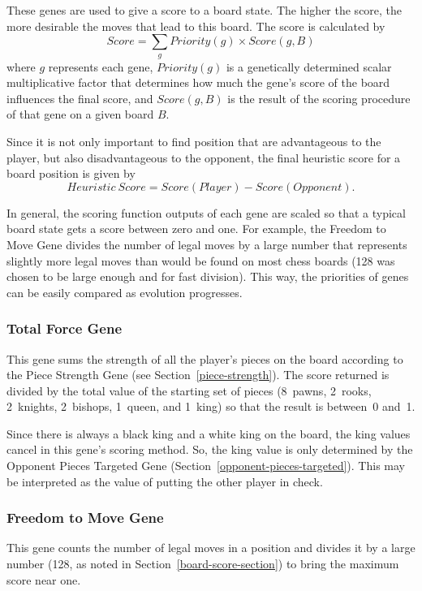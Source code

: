 \documentclass[letterpaper]{article}
\renewcommand{\_}{\allowbreak\textunderscore\allowbreak}
\begin{document}
These genes are used to give a score to a board state. The higher the score, the more desirable the moves that lead to this board. The score is calculated by
\[Score = \sum_g Priority(g) \times Score(g,B)\]
where \(g\) represents each gene, \(Priority(g)\) is a genetically determined scalar multiplicative factor that determines how much the gene's score of the board influences the final score, and \(Score(g,B)\) is the result of the scoring procedure of that gene on a given board \(B\).

Since it is not only important to find position that are advantageous to the player, but also disadvantageous to the opponent, the final heuristic score for a board position is given by
\[Heuristic\ Score = Score(Player) - Score(Opponent).\]

In general, the scoring function outputs of each gene are scaled so that a typical board state gets a score between zero and one. For example, the Freedom to Move Gene divides the number of legal moves by a large number that represents slightly more legal moves than would be found on most chess boards (128 was chosen to be large enough and for fast division). This way, the priorities of genes can be easily compared as evolution progresses.

\subsubsection{Total Force Gene}\label{total-force}
This gene sums the strength of all the player's pieces on the board according to the Piece Strength Gene (see Section~\ref{piece-strength}). The score returned is divided by the total value of the starting set of pieces (8~pawns, 2~rooks, 2~knights, 2~bishops, 1~queen, and 1~king) so that the result is between~0 and~1.

Since there is always a black king and a white king on the board, the king values cancel in this gene's scoring method. So, the king value is only determined by the Opponent Pieces Targeted Gene (Section~\ref{opponent-pieces-targeted}). This may be interpreted as the value of putting the other player in check.

\subsubsection{Freedom to Move Gene}
This gene counts the number of legal moves in a position and divides it by a large number (128, as noted in Section~\ref{board-score-section}) to bring the maximum score near one.
\end{document}
